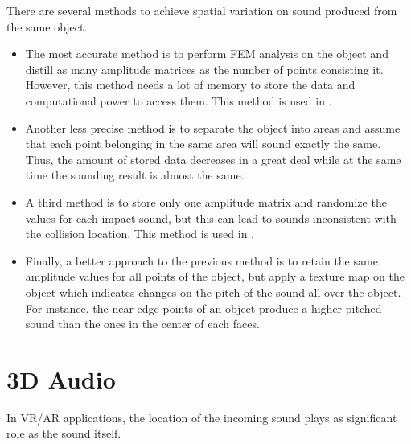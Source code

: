There are several methods to achieve spatial variation on sound produced from the same object. 
\begin{itemize}
\item The most accurate method is to perform FEM analysis on the object and distill as many amplitude matrices as the number of points consisting it. However, this method needs a lot of memory to store the data and computational power to access them. This method is used in \cite{o2002synthesizing}.
\item Another less precise method is to separate the object into areas and assume that each point belonging in the same area will sound exactly the same. Thus, the amount of stored data decreases in a great deal while at the same time the sounding result is almost the same.
\item A third method is to store only one amplitude matrix and randomize the values for each impact sound, but this can lead to sounds inconsistent with the collision location. This method is used in \cite{lloyd2011sound}.
\item Finally, a better approach to the previous method is to retain the same amplitude values for all points of the object, but apply a texture map on the object which indicates changes on the pitch of the sound all over the object. For instance, the near-edge points of an object produce a higher-pitched sound than the ones in the center of each faces. 
\end{itemize}

\section{3D Audio}
In VR/AR applications, the location of the incoming sound plays as significant role as the sound itself. 

